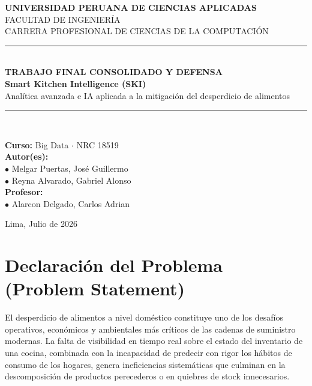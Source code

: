 \documentclass[11pt,a4paper]{article}
\begin{document}
\begin{titlepage}
    \centering
    {\large \textbf{UNIVERSIDAD PERUANA DE CIENCIAS APLICADAS}} \\[0.3cm]
    {\large \color{techgray}FACULTAD DE INGENIERÍA} \\[0.3cm]
    {\large \color{techgray}CARRERA PROFESIONAL DE CIENCIAS DE LA COMPUTACIÓN} \\[1.5cm]
    
    \vspace*{1.5cm}
    \rule{\linewidth}{2pt} \\[0.5cm]
    {\LARGE \bfseries \color{upcblue} TRABAJO FINAL CONSOLIDADO Y DEFENSA} \\[0.4cm]
    {\Large \textbf{Smart Kitchen Intelligence (SKI)}} \\[0.2cm]
    {\large \color{techgray}Analítica avanzada e IA aplicada a la mitigación del desperdicio de alimentos} \\[0.5cm]
    \rule{\linewidth}{2pt} \\[2.5cm]
    
    \begin{flushleft}
        \large
        \textbf{Curso:} Big Data $\cdot$ NRC 18519 \\[0.3cm]
        \textbf{Autor(es):} \\
        $\bullet$ Melgar Puertas, José Guillermo \\
        $\bullet$ Reyna Alvarado, Gabriel Alonso \\[0.3cm]
        \textbf{Profesor:} \\
        $\bullet$ Alarcon Delgado, Carlos Adrian
    \end{flushleft}
    
    \vfill
    {\large Lima, Julio de 2026}
\end{titlepage}

\newpage
\tableofcontents
\newpage

\section{Declaración del Problema (Problem Statement)}
El desperdicio de alimentos a nivel doméstico constituye uno de los desafíos operativos, económicos y ambientales más críticos de las cadenas de suministro modernas. La falta de visibilidad en tiempo real sobre el estado del inventario de una cocina, combinada con la incapacidad de predecir con rigor los hábitos de consumo de los hogares, genera ineficiencias sistemáticas que culminan en la descomposición de productos perecederos o en quiebres de stock innecesarios.
\end{document}
